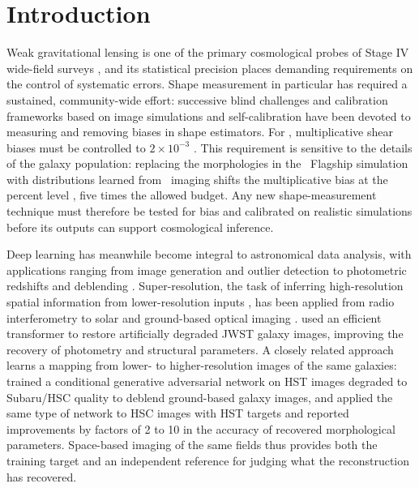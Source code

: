 \documentclass[longauth]{aa}
\begin{document}

   \maketitle

\section{Introduction}
\label{sc:intro}

Weak gravitational lensing is one of the primary cosmological probes of Stage IV wide-field surveys \citep{Laureijs2011, Chang2013}, and its statistical precision places demanding requirements on the control of systematic errors.
Shape measurement in particular has required a sustained, community-wide effort: successive blind challenges \citep{Heymans2006, Massey2007, Mandelbaum2015} and calibration frameworks based on image simulations and self-calibration \citep[e.g.,][]{Huff2017, Sheldon2017, EC_Congedo2024} have been devoted to measuring and removing biases in shape estimators.
For \Euclid, multiplicative shear biases must be controlled to $2\times10^{-3}$ \citep{Cropper2013}.
This requirement is sensitive to the details of the galaxy population: replacing the morphologies in the \Euclid\ Flagship simulation with distributions learned from \Euclid\ imaging shifts the multiplicative bias at the percent level \citep{EC_ShapeDist2026}, five times the allowed budget.
Any new shape-measurement technique must therefore be tested for bias and calibrated on realistic simulations before its outputs can support cosmological inference.

Deep learning has meanwhile become integral to astronomical data analysis, with applications ranging from image generation and outlier detection to photometric redshifts and deblending \citep{Arcelin2021, Hemmati2022, Sampson2024, Scognamiglio2025}.
Super-resolution, the task of inferring high-resolution spatial information from lower-resolution inputs \citep{Anwar2019}, has been applied from radio interferometry to solar and ground-based optical imaging \citep[e.g.,][]{Dabbech_2022, Song2024, Sukurdeep2025}.
\citet{park2024} used an efficient transformer to restore artificially degraded JWST galaxy images, improving the recovery of photometry and structural parameters.
A closely related approach learns a mapping from lower- to higher-resolution images of the same galaxies: \citet{Hemmati2022} trained a conditional generative adversarial network on HST images degraded to Subaru/HSC quality to deblend ground-based galaxy images, and \citet{Kahn2026} applied the same type of network to HSC images with HST targets and reported improvements by factors of 2 to 10 in the accuracy of recovered morphological parameters.
Space-based imaging of the same fields thus provides both the training target and an independent reference for judging what the reconstruction has recovered.
\end{document}

